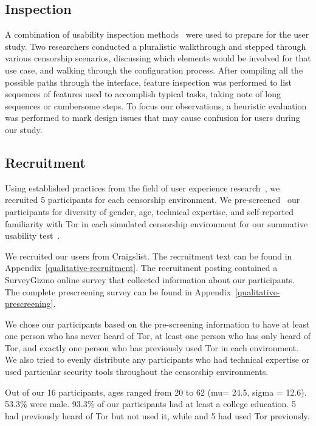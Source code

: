 \documentclass[USenglish,oneside,twocolumn]{article}
\begin{document}
\subsection{Inspection}
A combination of usability inspection methods~\cite{nielsen1994usability}
were used to prepare for the user study. Two researchers conducted a pluralistic 
walkthrough and stepped through various censorship
scenarios, discussing which elements would be involved for that use case, and walking 
through the configuration process. After compiling all the possible paths through the 
interface, feature inspection was performed to list sequences
of features used to accomplish typical tasks, taking note of long sequences or cumbersome
steps. To focus our observations, a heuristic evaluation was performed to mark design issues 
that may cause confusion for users during our study. 

\subsection{Recruitment}
Using established practices from the field of user experience research~\cite{howmanyusers},
we recruited 5 participants for each censorship environment.
We pre-screened~\cite{screening} our participants for diversity of gender, age, technical expertise,
and self-reported familiarity with Tor in each simulated censorship environment for our summative
usability test~\cite{summative}. 

We recruited our users from Craigslist. The recruitment text can be found in 
Appendix~\ref{qualitative-recruitment}. The recruitment posting contained a 
SurveyGizmo online survey that collected information about our participants.
The complete prescreening survey can be found in Appendix~\ref{qualitative-prescreening}.  

We chose our participants based on the pre-screening information to have 
at least one person who has never heard of Tor, at least one person who has 
only heard of Tor, and exactly one person who has previously used Tor in each
environment. We also tried to evenly distribute any participants who had technical
expertise or used particular security tools throughout the censorship environments. 

Out of our 16 participants, ages ranged from 20 to 62
(mu= 24.5, sigma = 12.6). 53.3\% were male. 
93.3\% of our participants had at least
a college education. 5 had previously heard of Tor but not used it, while 
and 5 had used Tor previously. 
\end{document}
